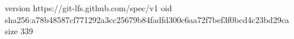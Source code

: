version https://git-lfs.github.com/spec/v1
oid sha256:a78b48587cf771292a3cc25679b84fadfd300c6aa72f7bef3f0bcd4c23bd29ca
size 339
